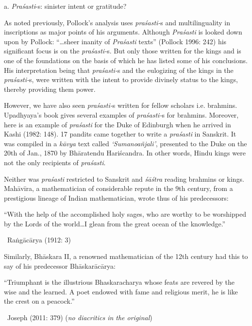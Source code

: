 a. \textit{Praśasti}-s: sinister intent or gratitude?

As noted previously, Pollock’s analysis uses \textit{praśasti-}s and multilinguality in inscriptions as major points of his arguments. Although \textit{Praśasti} is looked down upon by Pollock: “…sheer inanity of \textit{Praśasti} texts” (Pollock 1996: 242) his significant focus is on the \textit{praśasti-}s. But only those written for the kings and is one of the foundations on the basis of which he has listed some of his conclusions. His interpretation being that \textit{praśasti-}s and the eulogizing of the kings in the \textit{praśasti-}s, were written with the intent to provide divinely status to the kings, thereby providing them power.

However, we have also seen \textit{praśasti-}s written for fellow scholars i.e. brahmins. Upadhyaya’s book gives several examples of \textit{praśasti-}s for brahmins. Moreover, here is an example of \textit{praśasti} for the Duke of Edinburgh when he arrived in Kashi (1982: 148). 17 pandits came together to write a \textit{praśasti} in Sanskrit. It was compiled in a \textit{kāvya} text called \textit{‘Sumanoañjali’}, presented to the Duke on the 20th of Jan., 1870 by Bhāratendu Hariścandra. In other words, Hindu kings were not the only recipients of \textit{praśasti}.

Neither was \textit{praśasti} restricted to Sanskrit and \textit{śāśtra} reading brahmins or kings. Mahāvīra, a mathematician of considerable repute in the 9th century, from a prestigious lineage of Indian mathematician, wrote thus of his predecessors:

\begin{myquote}
“With the help of the accomplished holy sages, who are worthy to be worshipped by the Lords of the world…I glean from the great ocean of the knowledge.” 

~\hfill Raṅgācārya (1912: 3)
\end{myquote}

Similarly, Bhāskara II, a renowned mathematician of the 12th century had this to say of his predecessor Bhāskarācārya:

\begin{myquote}
“Triumphant is the illustrious Bhaskaracharya whose feats are revered by the wise and the learned. A poet endowed with fame and religious merit, he is like the crest on a peacock.” 

~\hfill Joseph (2011: 379) (\textit{no diacritics in the original})
\end{myquote}


